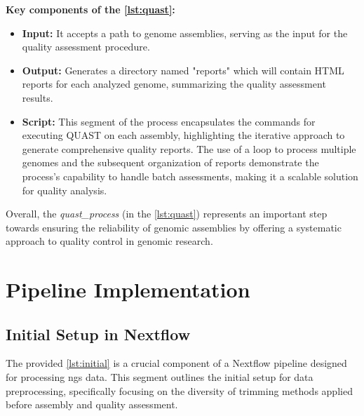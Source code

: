 \textbf{Key components of the \autoref{lst:quast}:}

\begin{itemize}
    \item \textbf{Input:} It accepts a path to \gls{genome} assemblies, serving as the input for the quality assessment procedure.
    \item \textbf{Output:} Generates a directory named "reports" which will contain HTML reports for each analyzed \gls{genome}, summarizing the quality assessment results.
    \item \textbf{Script:} This segment of the process encapsulates the commands for executing QUAST on each \gls{assembly}, highlighting the iterative approach to generate comprehensive quality reports. The use of a loop to process multiple \gls{genome}s and the subsequent organization of reports demonstrate the process's capability to handle batch assessments, making it a scalable solution for quality analysis.
\end{itemize}

Overall, the \textit{quast\_process} (in the \autoref{lst:quast}) represents an important step towards ensuring the reliability of genomic assemblies by offering a systematic approach to quality control in genomic research.













\section{Pipeline Implementation}

\subsection{Initial Setup in Nextflow}

The provided \autoref{lst:initial} is a crucial component of a Nextflow pipeline designed for processing \gls{ngs} data. This segment outlines the initial setup for data preprocessing, specifically focusing on the diversity of \gls{trimming} methods applied before \gls{assembly} and quality assessment.

